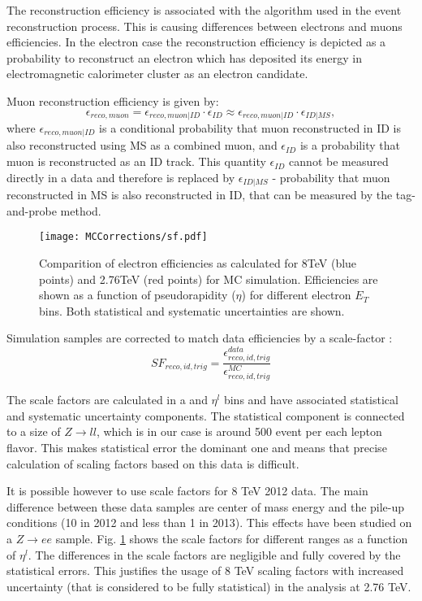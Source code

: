 The reconstruction efficiency is associated with the algorithm used in the event reconstruction process. This is causing differences between electrons and muons efficiencies. In the electron case the reconstruction efficiency is depicted as a probability to reconstruct an electron which has deposited its energy in electromagnetic calorimeter cluster as an electron candidate.  

Muon reconstruction efficiency is given by:
\begin{equation}
\epsilon_{reco,muon} = \epsilon_{reco,muon|ID} \cdot \epsilon_{ID} \approx \epsilon_{reco,muon|ID} \cdot \epsilon_{ID|MS},
\end{equation}
where $\epsilon_{reco,muon|ID}$ is a conditional probability that muon reconstructed in ID is also reconstructed using MS as a combined muon, and  $\epsilon_{ID}$ is a probability that muon is reconstructed as an ID track. This quantity $\epsilon_{ID}$ cannot be measured directly  in a data and therefore is replaced by $\epsilon_{ID|MS}$ - probability that muon reconstructed in MS is also reconstructed in ID, that can be measured by the tag-and-probe method. 

\begin{figure}[t]
\centering
\texttt{[image: MCCorrections/sf.pdf]}
\caption{Comparition of electron efficiencies as calculated for 8TeV (blue points) and 2.76TeV (red points) for MC simulation. Efficiencies are shown as a function of pseudorapidity ($\eta$) for different electron $E_T$ bins. Both statistical and systematic uncertainties are shown. }
\label{eff_comp}
\end{figure}
Simulation samples are corrected to match data efficiencies by a scale-factor :
\begin{equation}
SF_{reco,id,trig}=\frac{\epsilon^{data}_{reco,id,trig}}{\epsilon^{MC}_{reco,id,trig}}
\end{equation}

The scale factors are calculated in a \ptl and $\eta^{l}$ bins and have associated statistical and systematic uncertainty components. The statistical component is connected to a size of $Z\to ll$, which is in our case is around 500 event per each lepton flavor. This makes statistical error the dominant one and means that precise calculation of scaling factors based on this data is difficult.

It is possible however to use scale factors for 8 TeV 2012 data. The main difference between these data samples are center of mass energy and the pile-up conditions (10 in 2012 and less than 1 in 2013). This effects have been studied on a $Z\to ee$ sample. Fig. \ref{eff_comp} shows the scale factors for different \ptl ranges as a function of $\eta^{l}$. The differences in the scale factors are negligible and fully covered by the statistical errors. This justifies the usage of 8 TeV scaling factors with increased uncertainty (that is considered to be fully statistical) in the analysis at 2.76 TeV. 

